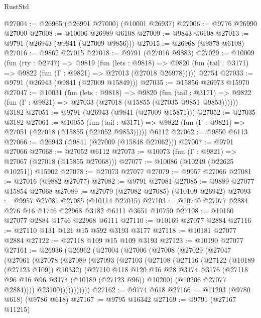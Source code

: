 \begin{lexlean}{RustStd}
\begin{coremodule}
@27004 := @26965 (@26991 @27000) (@10001 @26937)
@27006 := @9776 @26990 @27000
@27008 := @10006 @26989 @6108
@27009 := @9843 @6108
@27013 := @9791 (@26943 (@9841 (@27009 @9856)))
@27015 := @26968 (@9878 @6108)
@27016 := @9862 @27015
@27018 := @9791 (@27016 @9883)
@27029 := @10009
    (fun (rty : @2747) =>
    @9819
      (fun (lets : @9818) =>
      @9820 (fun (tail : @3171) => @9822 (fun (Γ : @9821) => @27013 (@27018 @26978)))))
    @2754
@27033 := @9791 (@26943 (@9841 (@27009 @15849)))
@27035 := @15856 @26973 @15970
@27047 := @10031
    (fun (lets : @9818) =>
    @9820
      (fun (tail : @3171) =>
      @9822 (fun (Γ : @9821) => @27033 (@27018 (@15855 (@27035 @9851 @9853))))))
    @3182
@27051 := @9791 (@26943 (@9841 (@27009 @15871)))
@27052 := @27035 @3182
@27061 := @10055
    (fun (tail : @3171) => @9822 (fun (Γ : @9821) => @27051 (@27018 (@15855 (@27052 @9853)))))
    @6112
@27062 := @9850 @6113
@27066 := @26943 (@9841 (@27009 (@15848 @27062)))
@27067 := @9791 @27066
@27068 := @27052 @6112
@27073 := @10073 (fun (Γ : @9821) => @27067 (@27018 (@15855 @27068)))
@27077 := @10086 (@10249 (@22625 @10251)) @15902
@27078 := @27073 @27077
@27079 := @9957 @27066
@27081 := @27016 (@9882 @27077)
@27082 := @9791 @27081
@27085 := @9889 @27077 @15854 @27068
@27089 := @27079 (@27082 @27085) (@10109 @26942)
@27093 := @9957 @27081 @27085 (@10114 @27015)
@27103 := @10740 @27077 @2884 @276 @16 @1746 @22968 @3182 @6111 @3651 @10750
@27108 := @10160 @27077 @2884 @1746 @22968 @6111
@27110 := @10169 @27077 @2884
@27116 := @27110 @131 @121 @15 @592 @3193 @3177
@27118 := @10181 @27077 @2884
@27122 := @27118 @109 @15 @109 @3193
@27123 := @10190 @27077
@27161 := @26936
    (@26962
      (@27004
        (@27006
          (@27008
            (@27029
              (@27047
                (@27061
                  (@27078
                    (@27089
                      (@27093
                        (@27103
                          (@27108
                            (@27116
                              (@27122 (@10189 (@27123 @109)) @10332)
                              (@27110
                                @118
                                @120
                                @16
                                @28
                                @3174
                                @3176
                                (@27118 @96 @16 @96 @3174 (@10189 (@27123 @96)) @10200)
                                (@10206 @27077 @2884))))
                          @23100)))))))))))
@27162 := @9774 @618
@27166 := @11203 (@9780 @618) (@9786 @618)
@27167 := @9795 @16342
@27169 := @9791 (@27167 @11215)

\end{coremodule}
\end{lexlean}
